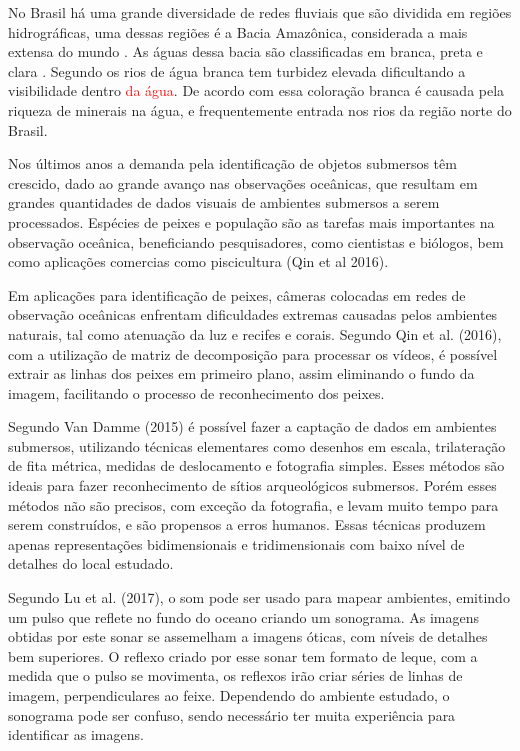 No Brasil há uma grande diversidade de redes fluviais que são dividida em regiões hidrográficas, uma dessas regiões é a Bacia Amazônica, considerada a mais extensa do mundo \cite{portalbrasil:2009}. As águas dessa bacia são classificadas em branca, preta e clara \cite{sioli:2012}. Segundo  os rios de água branca tem turbidez elevada dificultando a visibilidade dentro \textcolor{red}{da água}. De acordo com  essa coloração branca é causada pela riqueza de minerais na água, e frequentemente entrada nos rios da região norte do Brasil.

Nos últimos anos a demanda pela identificação de objetos submersos têm crescido, dado ao grande avanço nas observações oceânicas, que resultam em grandes quantidades de dados visuais de ambientes submersos a serem processados. Espécies de peixes e população são as tarefas mais importantes na observação oceânica, beneficiando pesquisadores, como cientistas e biólogos, bem como aplicações comercias como piscicultura (Qin et al 2016). 

Em aplicações para identificação de peixes, câmeras colocadas em redes de observação oceânicas enfrentam dificuldades extremas causadas pelos ambientes naturais, tal como atenuação da luz e recifes e corais. Segundo Qin et al. (2016), com a utilização de matriz de decomposição para processar os vídeos, é possível extrair as linhas dos peixes em primeiro plano, assim eliminando o fundo da imagem, facilitando o processo de reconhecimento dos peixes.

Segundo Van Damme (2015) é possível fazer a captação de dados em ambientes submersos, utilizando técnicas elementares como desenhos em escala, trilateração de fita métrica, medidas de deslocamento e fotografia simples. Esses métodos são ideais para fazer reconhecimento de sítios arqueológicos submersos. Porém esses métodos não são precisos, com exceção da fotografia, e levam muito tempo para serem construídos, e são propensos a erros humanos. Essas técnicas produzem apenas representações bidimensionais e tridimensionais com baixo nível de detalhes do local estudado.

Segundo  Lu et al. (2017), o som pode ser usado para mapear ambientes, emitindo um pulso que reflete no fundo do oceano criando um sonograma. As imagens obtidas por este sonar se assemelham a imagens óticas, com níveis de detalhes bem superiores. O reflexo criado por esse sonar tem formato de leque, com a medida que o pulso se movimenta, os reflexos irão criar séries de linhas de imagem, perpendiculares ao feixe. Dependendo do ambiente estudado, o sonograma pode ser confuso, sendo necessário ter muita experiência para identificar as imagens.

